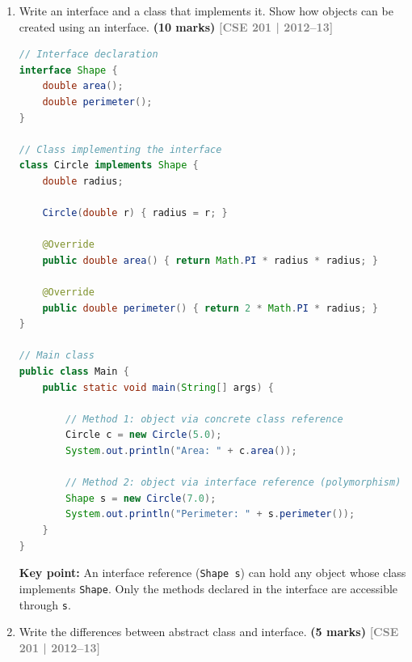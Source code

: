 \documentclass[12pt,a3paper]{article}
\newcommand{\yr}[1]{\hfill\textcolor{gray}{\small\textbf{[#1]}}}
\newcommand{\mk}[1]{\textcolor{orange!70!black}{\small\textbf{(#1 marks)}}}
\begin{document}
\begin{enumerate}
\begin{tcolorbox}
\end{tcolorbox}



\item Write an interface and a class that implements it. Show how objects can be created using an interface. \mk{10}
\yr{CSE 201 | 2012--13}

\begin{tcolorbox}[enhanced,breakable,ansbox,
  colback=cD!4,colframe=cD,boxrule=0.8pt,arc=5pt,
  title={\textbf{Answer --- Interface, Implementing Class \& Object Creation}},
  fonttitle=\bfseries\color{white},colbacktitle=cD]

\begin{lstlisting}[language=Java]
// Interface declaration
interface Shape {
    double area();
    double perimeter();
}

// Class implementing the interface
class Circle implements Shape {
    double radius;

    Circle(double r) { radius = r; }

    @Override
    public double area() { return Math.PI * radius * radius; }

    @Override
    public double perimeter() { return 2 * Math.PI * radius; }
}

// Main class
public class Main {
    public static void main(String[] args) {

        // Method 1: object via concrete class reference
        Circle c = new Circle(5.0);
        System.out.println("Area: " + c.area());

        // Method 2: object via interface reference (polymorphism)
        Shape s = new Circle(7.0);
        System.out.println("Perimeter: " + s.perimeter());
    }
}
\end{lstlisting}

\textbf{Key point:} An interface reference (\texttt{Shape s}) can hold any
object whose class implements \texttt{Shape}.  Only the methods declared
in the interface are accessible through \texttt{s}.

\end{tcolorbox}

\item Write the differences between abstract class and interface. \mk{5}
\yr{CSE 201 | 2012--13}

\begin{tcolorbox}[enhanced,breakable,ansbox,
  colback=cD!4,colframe=cD,boxrule=0.8pt,arc=5pt,
  title={\textbf{Answer --- Abstract Class vs.\ Interface}},
  fonttitle=\bfseries\color{white},colbacktitle=cD]


\end{tcolorbox}
\end{enumerate}
\end{document}
